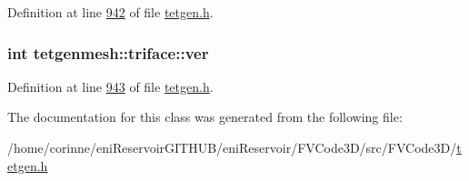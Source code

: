 Definition at line \hyperlink{tetgen_8h_source_l00942}{942} of file \hyperlink{tetgen_8h_source}{tetgen.\+h}.

\subsubsection[{\texorpdfstring{ver}{ver}}]{\setlength{\rightskip}{0pt plus 5cm}int tetgenmesh\+::triface\+::ver}\hypertarget{classtetgenmesh_1_1triface_a2b2b1dc34da73125359d6db535d75f7c}{}\label{classtetgenmesh_1_1triface_a2b2b1dc34da73125359d6db535d75f7c}


Definition at line \hyperlink{tetgen_8h_source_l00943}{943} of file \hyperlink{tetgen_8h_source}{tetgen.\+h}.



The documentation for this class was generated from the following file\+:\begin{DoxyCompactItemize}
\item 
/home/corinne/eni\+Reservoir\+G\+I\+T\+H\+U\+B/eni\+Reservoir/\+F\+V\+Code3\+D/src/\+F\+V\+Code3\+D/\hyperlink{tetgen_8h}{tetgen.\+h}\end{DoxyCompactItemize}
